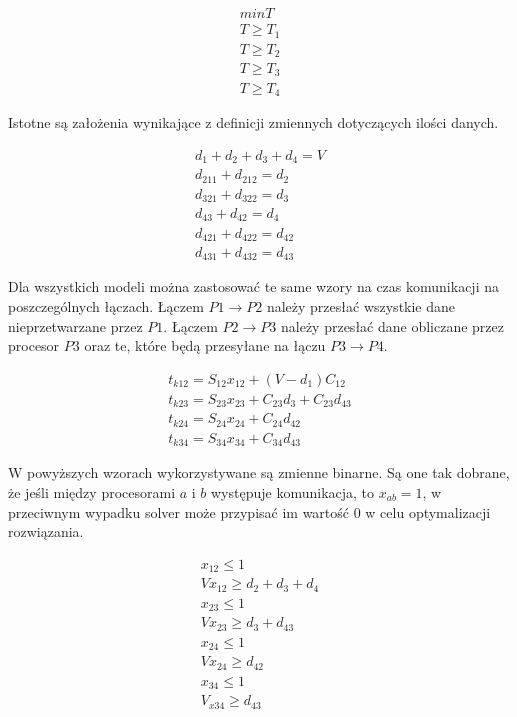 \begin{equation} \label{eq:min}
\begin{array}{l}
min T \\
T \geq T_{1} \\
T \geq T_{2} \\
T \geq T_{3} \\
T \geq T_{4}
\end{array}
\end{equation}

Istotne są założenia wynikające z definicji zmiennych dotyczących ilości danych.

\begin{equation} \label{eq:data}
\begin{array}{l}
d_{1} + d_{2} + d_{3} + d_{4} = V \\
d_{211} + d_{212} = d_{2} \\
d_{321} + d_{322} = d_{3} \\
d_{43} + d_{42} = d_{4} \\
d_{421} + d_{422} = d_{42} \\
d_{431} + d_{432} = d_{43}
\end{array}
\end{equation}

Dla wszystkich modeli można zastosować te same wzory na czas komunikacji na poszczególnych łączach.
Łączem $P1 \to P2$ należy przesłać wszystkie dane nieprzetwarzane przez $P1$.
Łączem $P2 \to P3$ należy przesłać dane obliczane przez procesor $P3$ oraz te, które będą przesyłane na łączu $P3 \to P4$. 

\begin{equation} \label{eq:tk}
\begin{array}{l}
t_{k12} = S_{12}x_{12} + (V - d_{1})C_{12} \\
t_{k23} = S_{23}x_{23} + C_{23}d_{3} + C_{23}d_{43} \\
t_{k24} = S_{24}x_{24} + C_{24}d_{42} \\
t_{k34} = S_{34}x_{34} + C_{34}d_{43}
\end{array}
\end{equation}

W powyższych wzorach wykorzystywane są zmienne binarne. Są one tak dobrane, że jeśli między procesorami $a$ i $b$ występuje komunikacja,
to $x_{ab} = 1$, w przeciwnym wypadku solver może przypisać im wartość $0$ w celu optymalizacji rozwiązania.

\begin{equation} \label{eq:x}
\begin{array}{l}
x_{12} \leq 1 \\
Vx_{12} \geq d_{2} + d_{3} + d_{4} \\
x_{23} \leq 1 \\
Vx_{23} \geq d_{3} + d_{43} \\
x_{24} \leq 1 \\
Vx_{24} \geq d_{42} \\
x_{34} \leq 1 \\
V_{x34} \geq d_{43}
\end{array}
\end{equation}

